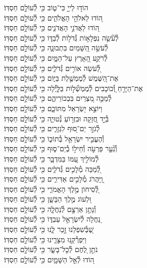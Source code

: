 \documentclass[twoside, openany, parskip=half, 11pt]{book}
\begin{document}
\begin{narrow}
הוֹד֣וּ לַייָ֣ כִּי־ט֑וֹב \hfill
כִּ֖י לְ֯עוֹלָ֣ם חַסְדּֽוֹ׃\\
ה֭וֹדוּ לֵאלֹהֵ֣י הָאֱלֹהִ֑ים \hfill כִּ֖י לְ֯עוֹלָ֣ם חַסְדּֽוֹ׃\\
ה֭וֹדוּ לַאֲדֹנֵ֣י הָאֲדֹנִ֑ים \hfill כִּ֖י לְ֯עוֹלָ֣ם חַסְדּֽוֹ׃\\
לְ֯עֹ֘שֵׂ֤ה נִפְלָא֣וֹת גְּ֯דֹל֣וֹת לְ֯בַדּ֑וֹ \hfill כִּ֖י לְ֯עוֹלָ֣ם חַסְדּֽוֹ׃\\
לְ֯עֹשֵׂ֣ה הַ֭שָּׁמַיִם בִּתְבוּנָ֑ה \hfill כִּ֖י לְ֯עוֹלָ֣ם חַסְדּֽוֹ׃\\
לְ֯רֹקַ֣ע הָ֭אָרֶץ עַל־הַמָּ֑יִם \hfill כִּ֖י לְ֯עוֹלָ֣ם חַסְדּֽוֹ׃\\
לְ֭֯עֹשֵׂה אוֹרִ֣ים גְּ֯דֹלִ֑ים \hfill כִּ֖י לְ֯עוֹלָ֣ם חַסְדּֽוֹ׃\\
אֶת־הַ֭שֶּׁמֶשׁ לְ֯מֶמְשֶׁ֣לֶת בַּיּ֑וֹם \hfill כִּ֖י לְ֯עוֹלָ֣ם חַסְדּֽוֹ׃\\
אֶת־הַיָּרֵ֣חַ וְ֭֯כוֹכָבִים לְ֯מֶמְשְׁ֯ל֣וֹת בַּלָּ֑יְ֯לָה \hfill כִּ֖י לְ֯עוֹלָ֣ם חַסְדּֽוֹ׃\\
לְ֯מַכֵּ֣ה מִ֭צְרַיִם בִּבְכוֹרֵיהֶ֑ם \hfill כִּ֖י לְ֯עוֹלָ֣ם חַסְדּֽוֹ׃\\
וַיּוֹצֵ֣א יִ֭שְׂרָאֵל מִתּוֹכָ֑ם \hfill כִּ֖י לְ֯עוֹלָ֣ם חַסְדּֽוֹ׃\\
בְּ֯יָ֣ד חֲ֭זָקָה וּבִזְר֣וֹעַ נְ֯טוּיָ֑ה \hfill כִּ֖י לְ֯עוֹלָ֣ם חַסְדּֽוֹ׃\\
לְ֯גֹזֵ֣ר יַם־ס֭וּף לִגְזָרִ֑ים \hfill כִּ֖י לְ֯עוֹלָ֣ם חַסְדּֽוֹ׃\\
וְ֯הֶעֱבִ֣יר יִשְׂרָאֵ֣ל בְּ֯תוֹכ֑וֹ \hfill כִּ֖י לְ֯עוֹלָ֣ם חַסְדּֽוֹ׃\\
וְ֯נִ֘עֵ֤ר פַּרְעֹ֣ה וְ֯חֵיל֣וֹ בְ֯יַם־ס֑וּף \hfill כִּ֖י לְ֯עוֹלָ֣ם חַסְדּֽוֹ׃\\
לְ֯מוֹלִ֣יךְ עַ֭מּוֹ בַּמִּדְבָּ֑ר \hfill כִּ֖י לְ֯עוֹלָ֣ם חַסְדּֽוֹ׃\\
לְ֭֯מַכֵּה מְ֯לָכִ֣ים גְּ֯דֹלִ֑ים \hfill כִּ֖י לְ֯עוֹלָ֣ם חַסְדּֽוֹ׃\\
וַֽ֭יַּהֲרֹג מְ֯לָכִ֣ים אַדִּירִ֑ים \hfill כִּ֖י לְ֯עוֹלָ֣ם חַסְדּֽוֹ׃\\
לְ֭֯סִיחוֹן מֶ֣לֶךְ הָאֱמֹרִ֑י \hfill כִּ֖י לְ֯עוֹלָ֣ם חַסְדּֽוֹ׃\\
וּ֭לְעוֹג מֶ֣לֶךְ הַבָּשָׁ֑ן \hfill כִּ֖י לְ֯עוֹלָ֣ם חַסְדּֽוֹ׃\\
וְ֯נָתַ֣ן אַרְצָ֣ם לְ֯נַחֲלָ֑ה \hfill כִּ֖י לְ֯עוֹלָ֣ם חַסְדּֽוֹ׃\\
נַ֭חֲלָה לְ֯יִשְׂרָאֵ֣ל עַבְדּ֑וֹ \hfill כִּ֖י לְ֯עוֹלָ֣ם חַסְדּֽוֹ׃\\
שֶׁ֭בְּ֯שִׁפְלֵנוּ זָ֣כַר לָ֑נוּ \hfill כִּ֖י לְ֯עוֹלָ֣ם חַסְדּֽוֹ׃\\
וַיִּפְרְ֯קֵ֥נוּ מִצָּרֵ֑ינוּ \hfill כִּ֖י לְ֯עוֹלָ֣ם חַסְדּֽוֹ׃\\
נֹתֵ֣ן לֶ֭חֶם לְ֯כׇל־בָּשָׂ֑ר \hfill כִּ֖י לְ֯עוֹלָ֣ם חַסְדּֽוֹ׃\\
ה֭וֹדוּ לְ֯אֵ֣ל הַשָּׁמָ֑יִם \hfill כִּ֖י לְ֯עוֹלָ֣ם חַסְדּֽוֹ׃\\



\end{narrow}
\end{document}
